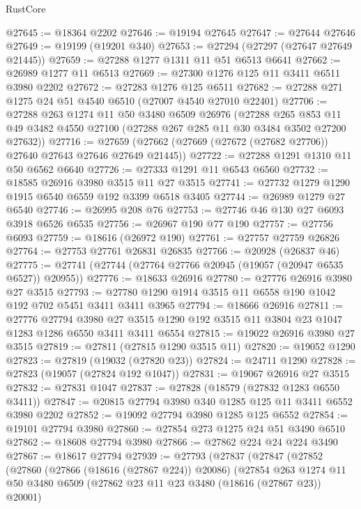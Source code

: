 \begin{lexlean}{RustCore}
\begin{coremodule}
@27645 := @18364 @2202
@27646 := @19194 @27645
@27647 := @27644 @27646
@27649 := @19199 (@19201 @340)
@27653 := @27294 (@27297 (@27647 @27649 @21445))
@27659 := @27288 @1277 @1311 @11 @51 @6513 @6641
@27662 := @26989 @1277 @11 @6513
@27669 := @27300 @1276 @125 @11 @3411 @6511 @3980 @2202
@27672 := @27283 @1276 @125 @6511
@27682 := @27288 @271 @1275 @24 @51 @4540 @6510 (@27007 @4540 @27010 @22401)
@27706 := @27288
    @263
    @1274
    @11
    @50
    @3480
    @6509
    @26976
    (@27288
      @265
      @853
      @11
      @49
      @3482
      @4550
      @27100
      (@27288 @267 @285 @11 @30 @3484 @3502 @27200 @27632))
@27716 := @27659 (@27662 (@27669 (@27672 (@27682 @27706)) @27640 @27643 @27646 @27649 @21445))
@27722 := @27288 @1291 @1310 @11 @50 @6562 @6640
@27726 := @27333 @1291 @11 @6543 @6560
@27732 := @18585 @26916 @3980 @3515 @11 @27 @3515
@27741 := @27732 @1279 @1290 @1915 @6540 @6559 @192 @3399 @6518 @3405
@27744 := @26989 @1279 @27 @6540
@27746 := @26995 @208 @76
@27753 := @27746 @46 @130 @27 @6093 @3918 @6526 @6535
@27756 := @26967 @190 @77 @190
@27757 := @27756 @6093
@27759 := @18616 (@26972 @190)
@27761 := @27757 @27759 @26826
@27764 := @27753 @27761 @26831 @26835
@27766 := @20928 (@26837 @46)
@27775 := @27741 (@27744 (@27764 @27766 @20945 (@19057 (@20947 @6535 @6527)) @20955))
@27776 := @18633 @26916
@27780 := @27776 @26916 @3980 @27 @3515
@27793 := @27780 @1290 @1914 @3515 @11 @6558 @190 @1042 @192 @702 @5451 @3411 @3411 @3965
@27794 := @18666 @26916
@27811 := @27776
    @27794
    @3980
    @27
    @3515
    @1290
    @192
    @3515
    @11
    @3804
    @23
    @1047
    @1283
    @1286
    @6550
    @3411
    @3411
    @6554
@27815 := @19022 @26916 @3980 @27 @3515
@27819 := @27811 (@27815 @1290 @3515 @11)
@27820 := @19052 @1290
@27823 := @27819 (@19032 (@27820 @23))
@27824 := @24711 @1290
@27828 := @27823 (@19057 (@27824 @192 @1047))
@27831 := @19067 @26916 @27 @3515
@27832 := @27831 @1047
@27837 := @27828 (@18579 (@27832 @1283 @6550 @3411))
@27847 := @20815 @27794 @3980 @340 @1285 @125 @11 @3411 @6552 @3980 @2202
@27852 := @19092 @27794 @3980 @1285 @125 @6552
@27854 := @19101 @27794 @3980
@27860 := @27854 @273 @1275 @24 @51 @3490 @6510
@27862 := @18608 @27794 @3980
@27866 := @27862 @224 @24 @224 @3490
@27867 := @18617 @27794
@27939 := @27793
    (@27837
      (@27847
        (@27852
          (@27860
            (@27866 (@18616 (@27867 @224)) @20086)
            (@27854
              @263
              @1274
              @11
              @50
              @3480
              @6509
              (@27862 @23 @11 @23 @3480 (@18616 (@27867 @23)) @20001)

\end{coremodule}
\end{lexlean}
